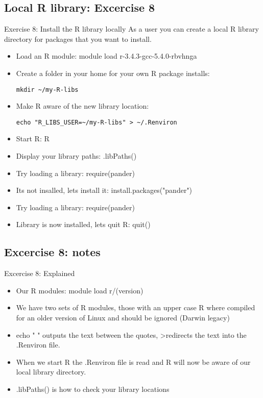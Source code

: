 \subsection{Local R library: Excercise 8}
\begin{frame}[fragile]{Exercise 8: Install the R library locally}
As a user you can create a local R library directory for packages that you want to install. 
\begin{itemize}
\item Load an R module: 
module load r-3.4.3-gcc-5.4.0-rbvhnga
\item Create a folder in your home for your own R package installs:
\begin{verbatim}
mkdir ~/my-R-libs
\end{verbatim}
\item Make R aware of the new library location:
\begin{verbatim}
echo "R_LIBS_USER=~/my-R-libs" > ~/.Renviron
\end{verbatim}
\item Start R:
R
\item Display your library paths:
.libPaths()
\item Try loading a library:
require(pander)
\item Its not insalled, lets install it:
install.packages("pander")
\item Try loading a library:
require(pander)
\item Library is now installed, lets quit R:
quit()
\end{itemize}
\end{frame}

\subsection{Excercise 8: notes}
\begin{frame}[fragile]{Excercise 8: Explained}
\begin{itemize}
\item Our R modules: module load r/(version)
\item We have two sets of R modules, those with an upper case R where compiled for an older version of Linux and should be ignored (Darwin legacy)
\item echo " " outputs the text between the quotes, \textgreater redirects the text into the .Renviron file.
\item When we start R the .Renviron file is read and R will now be aware of our local library directory.
\item .libPaths() is how to check your library locations 
\end{itemize}
\end{frame}

